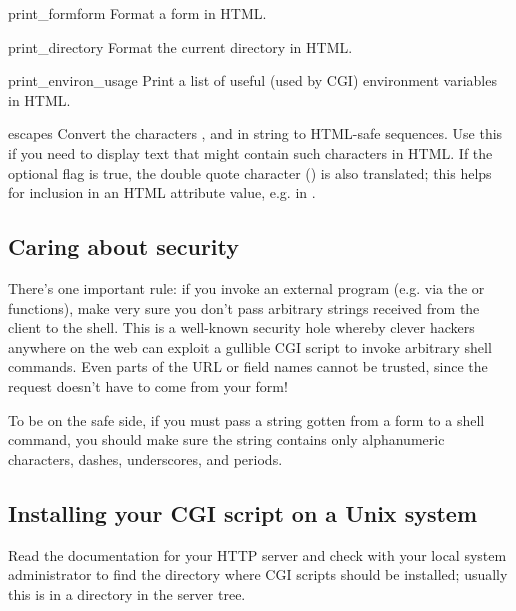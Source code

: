 \begin{funcdesc}{print_form}{form}
Format a form in HTML.
\end{funcdesc}

\begin{funcdesc}{print_directory}{}
Format the current directory in HTML.
\end{funcdesc}

\begin{funcdesc}{print_environ_usage}{}
Print a list of useful (used by CGI) environment variables in
HTML.
\end{funcdesc}

\begin{funcdesc}{escape}{s}
Convert the characters
\character{\&}, \character{<} and \character{>} in string  to
HTML-safe sequences.  Use this if you need to display text that might
contain such characters in HTML.  If the optional flag  is
true, the double quote character () is also translated;
this helps for inclusion in an HTML attribute value, e.g. in .
\end{funcdesc}


\subsection{Caring about security}

There's one important rule: if you invoke an external program (e.g.
via the  or  functions),
make very sure you don't pass arbitrary strings received from the
client to the shell.  This is a well-known security hole whereby
clever hackers anywhere on the web can exploit a gullible CGI script
to invoke arbitrary shell commands.  Even parts of the URL or field
names cannot be trusted, since the request doesn't have to come from
your form!

To be on the safe side, if you must pass a string gotten from a form
to a shell command, you should make sure the string contains only
alphanumeric characters, dashes, underscores, and periods.


\subsection{Installing your CGI script on a Unix system}

Read the documentation for your HTTP server and check with your local
system administrator to find the directory where CGI scripts should be
installed; usually this is in a directory  in the server tree.


